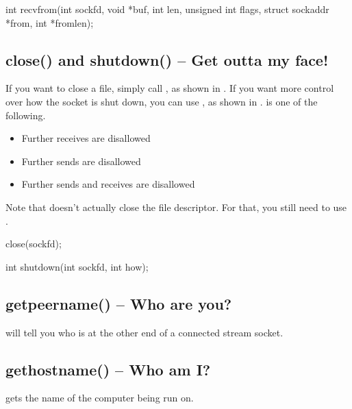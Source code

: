\begin{CPP}[label=list:recvfrom-api,caption=recvfrom API]
int recvfrom(int sockfd, void *buf, int len, unsigned int flags,
        struct sockaddr *from, int *fromlen);
\end{CPP}

\subsection{close() and shutdown() -- Get outta my face!}
If you want to close a file, simply call , as shown in . If you want more control over how the socket is shut down, you can use , as shown in .  is one of the following.
\begin{itemize}
  \item {} Further receives are disallowed
  \item {} Further sends are disallowed
  \item {} Further sends and receives are disallowed 
\end{itemize}

Note that  doesn't actually close the file descriptor. For that, you still need to use .

\begin{CPP}[label=list:close-api,caption=close API]
close(sockfd);
\end{CPP}

\begin{CPP}[label=list:shutdown-api,caption=shutdown API]
int shutdown(int sockfd, int how);
\end{CPP}

\subsection{getpeername() -- Who are you?}
 will tell you who is at the other end of a connected stream socket. 

\subsection{gethostname() -- Who am I?}
 gets the name of the computer being run on.


